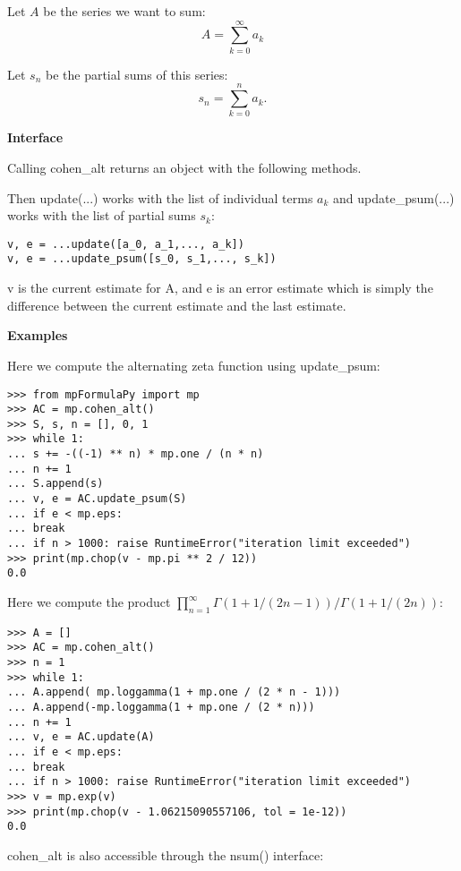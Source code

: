 Let $A$ be the series we want to sum:
\begin{equation}
A=\sum_{k=0}^{\infty} a_k
\end{equation}

Let $s_n$ be the partial sums of this series:
\begin{equation}
s_n=\sum_{k=0}^n a_k.
\end{equation}

\vpara
\textbf{Interface}

Calling cohen\_alt returns an object with the following methods.

Then update(...) works with the list of individual terms $a_k$ and update\_psum(...) works with the list of partial sums $s_k$:

\begin{lstlisting}
v, e = ...update([a_0, a_1,..., a_k])
v, e = ...update_psum([s_0, s_1,..., s_k])
\end{lstlisting}


v is the current estimate for A, and e is an error estimate which is simply the difference between the current estimate and the last estimate.

\vpara
\textbf{Examples}

Here we compute the alternating zeta function using update\_psum:

\begin{lstlisting}
>>> from mpFormulaPy import mp
>>> AC = mp.cohen_alt()
>>> S, s, n = [], 0, 1
>>> while 1:
... s += -((-1) ** n) * mp.one / (n * n)
... n += 1
... S.append(s)
... v, e = AC.update_psum(S)
... if e < mp.eps:
... break
... if n > 1000: raise RuntimeError("iteration limit exceeded")
>>> print(mp.chop(v - mp.pi ** 2 / 12))
0.0
\end{lstlisting}

Here we compute the product $\prod_{n=1}^{\infty} \Gamma(1+1/(2n-1))/\Gamma(1+1/(2n))$:

\begin{lstlisting}
>>> A = []
>>> AC = mp.cohen_alt()
>>> n = 1
>>> while 1:
... A.append( mp.loggamma(1 + mp.one / (2 * n - 1)))
... A.append(-mp.loggamma(1 + mp.one / (2 * n)))
... n += 1
... v, e = AC.update(A)
... if e < mp.eps:
... break
... if n > 1000: raise RuntimeError("iteration limit exceeded")
>>> v = mp.exp(v)
>>> print(mp.chop(v - 1.06215090557106, tol = 1e-12))
0.0
\end{lstlisting}

cohen\_alt is also accessible through the nsum() interface:

